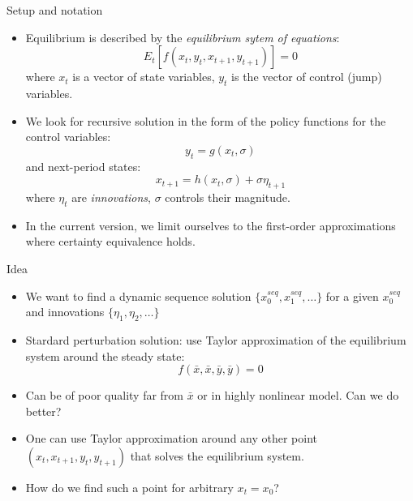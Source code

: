 \documentclass{beamer}
\begin{document}
\begin{frame}{Setup and notation}
    \begin{itemize}
        \item Equilibrium is described by the \emph{equilibrium sytem of equations}:
            \[
                E_t \left[ f(x_t,y_t,x_{t+1},y_{t+1}) \right]  = 0
            \]
            where $x_t$ is a vector of state variables, $y_t$ is the vector 
            of control (jump) variables.

        \item We look for recursive solution in the form of the policy functions
            for the control variables:
            \[
                y_t = g(x_t,\sigma)
            \]
            and next-period states:
            \[
                x_{t+1} = h(x_t,\sigma) + \sigma \eta_{t+1}
            \]
            where $\eta_t$ are \emph{innovations}, $\sigma$ controls their magnitude.

        \item In the current version, we limit ourselves to the first-order
    approximations where certainty equivalence holds.
    \end{itemize}

\end{frame}

\begin{frame}{Idea}

    \begin{itemize}
        \item We want to find a dynamic sequence solution 
            $\{x^{seq}_0, x^{seq}_1, \ldots \}$ for
            a given $x^{seq}_0$ and innovations $\{ \eta_1, \eta_2, \ldots \}$
            \bigskip
        \item Stardard perturbation solution: use Taylor approximation
            of the equilibrium system around the steady state:
            \[
                f(\bar{x}, \bar{x}, \bar{y}, \bar{y}) = 0
            \]
            \medskip
        \item Can be of poor quality far from $\bar{x}$ or in highly
            nonlinear model. Can we do better?
            \bigskip
        \item One can use Taylor approximation around any other point
    $(x_t,x_{t+1},y_t,y_{t+1})$ that solves the equilibrium 
    system.
            \bigskip
        \item How do we find such a point for arbitrary $x_t = x_0$?
    \end{itemize}

\end{frame}
\end{document}
